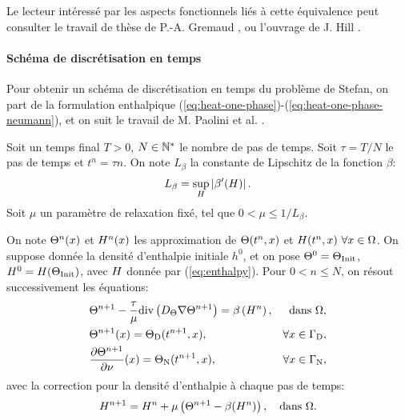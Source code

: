 Le lecteur intéressé par les aspects fonctionnels liés à cette
équivalence peut consulter le travail de thèse de
P.-A. Gremaud \cite{Gremaud1991}, ou l'ouvrage de J. Hill
\cite{HillStefanProblems}.

\paragraph{Schéma de discrétisation en temps}
Pour obtenir un schéma de discrétisation en temps du problème de
Stefan, on part de la formulation enthalpique
(\ref{eq:heat-one-phase})-(\ref{eq:heat-one-phase-neumann}), et on
suit le travail de M. Paolini et al. \cite{Paolini1988}.

Soit un temps final $T > 0$, $N\in \mathbb {\mathbb N^*}$ le nombre de pas de
temps. Soit $\tau = T / N$ le pas de temps et $t^n = \tau n$. On note
$L_\beta$ la constante de Lipschitz de la fonction $\beta$:
\begin{equation}
  L_\beta = \sup_{H}\left\lvert \beta'(H) \right\rvert.
\end{equation}
Soit $\mu$ un paramètre de relaxation fixé, tel que $0 < \mu \leq
1/L_\beta$.

On note $\Theta^n(x)$ et $H^n(x)$ les approximation
de $\Theta(t^n, x)$ et $H(t^n, x)\ \forall x\in
\Omega$.  On suppose donnée la densité d'enthalpie initiale $h^0$, et
on pose $\Theta^0 = \Theta_\text{Init}$, $H^0 = H(\Theta_\text{Init})$,
avec $H$ donnée par (\ref{eq:enthalpy}). Pour $0 < n \leq N$, on résout
successivement les équations:
\begin{align}
  &\temperature^{n+1} - \frac{\tau}{\mu} \div\parent{
    \electrolytetdiff \nabla\temperature^{n+1}} = %
  \beta\parent{\enthalpydensity^n}, & \text{dans } \Omega,\label{eq:chernoff-heat}\\
  &\temperature^{n+1}(x) = \temperature_{\mathrm D}(t^{n+1}, x), &
  \forall x\in%
  \Gamma_\mathrm{D},\label{eq:chernoff-dirichlet}\\
  &\frac{\partial\temperature^{n+1}}{\partial \nu}(x) = %
  \temperature_\mathrm{N}(t^{n+1}, x), %
  & \forall x \in \Gamma_\mathrm{N},\label{eq:chernoff-neumann}
\end{align}
avec la correction pour la densité d'enthalpie à chaque pas de temps:
\begin{equation}\label{eq:chernoff-update}
H^{n+1} = H^{n} +
\mu\left( \Theta^{n+1} - \beta(H^{n}) \right), \quad
\text{dans } \Omega.
\end{equation}

